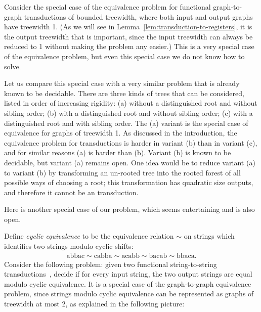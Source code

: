 \begin{example}\label{ex:trees}
    Consider the special case of the equivalence problem for functional graph-to-graph \mso transductions of bounded treewidth, where both input and output graphs have treewidth 1. (As we will see in Lemma~\ref{lem:transduction-to-registers}, it is the output treewidth that is important, since the input treewidth can always be reduced to 1 without making the problem any easier.) This is a very special case of the equivalence problem, but even this special case we do not know how to solve.
    
    Let us compare this special case with a very similar problem that is already known to be decidable. There are three kinds of trees that can be considered, listed in order of increasing rigidity: (a) without a distinguished root and without sibling order; (b)  with a distinguished root and without sibling order; (c) with a distinguished root and with sibling order. The (a) variant is the special case of equivalence for graphs of treewidth 1.  As discussed in the introduction, the equivalence problem for \mso transductions is harder in  variant (b) than in variant (c), and for similar reasons (a) is harder than (b). Variant (b) is known to be decidable, but variant (a) remains open.  One idea would be to reduce variant (a) to variant (b) by transforming an  un-rooted tree into the rooted forest of all possible ways of choosing a root; this transformation has quadratic size outputs, and therefore it cannot be an \mso transduction.
    \end{example}   

    Here is another special case of our problem, which seems entertaining and is also open.
    \begin{example}
        Define \emph{cyclic equivalence} to be the equivalence relation $\sim$ on strings which identifies two strings modulo cyclic shifts:
        \begin{align*}
            \text{abbac} \sim
            \text{cabba} \sim
            \text{acabb} \sim
            \text{bacab} \sim
            \text{bbaca}   .
         \end{align*}
         Consider the following  problem: given two functional string-to-string \mso transductions~\cite[Definition 1]{engelfrietMSODefinableString2001},
        decide if for every input string, the two output strings are equal  modulo cyclic equivalence. %
         It is a special case of the graph-to-graph equivalence problem, since  strings modulo cyclic equivalence  can be represented as graphs of treewidth at most 2, as explained in the following picture:
        \end{example}